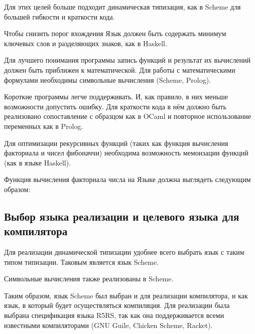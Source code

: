         Для этих целей больше подходит динамическая типизация, как в Scheme для большей гибкости и краткости кода.

        Чтобы снизить порог вхождения Язык должен быть содержать минимум ключевых слов и разделяющих знаков, как в Haskell.

        Для лучшего понимания программы запись функций и результат их вычислений должен быть приближен к математической.
        Для работы с математическими формулами необходимы символьные вычисления (Scheme, Prolog).

        Короткие программы легче поддерживать.
        И, как правило, в них меньше возможности допустить ошибку.
        Для краткости кода в нём должно быть реализовано сопоставление с образцом как в OCaml и повторное использование переменных как в Prolog.

        Для оптимизации рекурсивных функций (таких как функция вычисления факториала и чисел фибоначчи) необходима возможность мемоизации функций (как в языке Haskell).

        Функция вычисления факториала числа на Языке должна выглядеть следующим образом:

        

    \subsection{Выбор языка реализации и целевого языка для компилятора}
        Для реализации динамической типизации удобнее всего выбрать язык с таким типом типизации.
        Таковым является язык Scheme.

        Символьные вычисления также реализованы в Scheme.

        Таким образом, язык Scheme был выбран и для реализации компилятора, и как язык, в который будет осуществляться компиляция.
        Для реализации была выбрана спецификация языка R5RS, так как она поддерживается всеми известными компиляторами (GNU Guile, Chicken Scheme, Racket).
